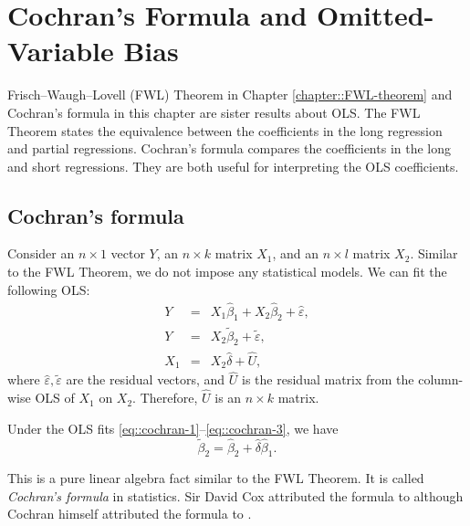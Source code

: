  
\chapter{Cochran's Formula and Omitted-Variable Bias}
 \label{chapter::cochran-ovb}
 

Frisch--Waugh--Lovell (FWL) Theorem in Chapter \ref{chapter::FWL-theorem} and Cochran's formula in this chapter are sister results about OLS. The FWL Theorem states the equivalence between the coefficients in the long regression and partial regressions. Cochran's formula compares the coefficients in the  long and short regressions. They are both useful for interpreting the OLS coefficients.  


 
 
 
 
\section{Cochran's formula} 
 
 Consider an $n\times 1$ vector $Y$, an $n\times k$ matrix $X_1$, and an $n\times l$ matrix $X_2$. Similar to the FWL Theorem, we do not impose any statistical models. 
We can fit the following OLS:
\begin{eqnarray}
Y &=& X_1 \hat{\beta}_1 + X_2 \hat{\beta}_2+ \hat{\varepsilon},  \label{eq::cochran-1} \\
Y &=& X_2 \tilde{\beta}_2 + \tilde{\varepsilon} ,\label{eq::cochran-2} \\
X_1 &=& X_2 \hat{\delta} + \hat{U}, \label{eq::cochran-3} 
\end{eqnarray}
where $\hat{\varepsilon}, \tilde{\varepsilon}$ are the residual vectors, and $\hat{U} $ is the residual matrix from the column-wise OLS of $X_1$ on $X_2$. Therefore, $\hat{U}$ is an $n\times k$ matrix.
 
 
 

 \begin{theorem}
 \label{thm::cochran-formula}
 Under the OLS fits \eqref{eq::cochran-1}--\eqref{eq::cochran-3}, we have 
 $$
\tilde{\beta}_2 = \hat{\beta}_2 +  \hat{\delta} \hat{\beta}_1.
$$
 \end{theorem}
 
This is a pure linear algebra fact similar to the FWL Theorem. It is called {\it Cochran's formula} in statistics. Sir David Cox \citep{cox2007generalization} attributed the formula to \citet{cochran1938omission} although Cochran himself attributed the formula to \citet{fisher1925statistical}. 


